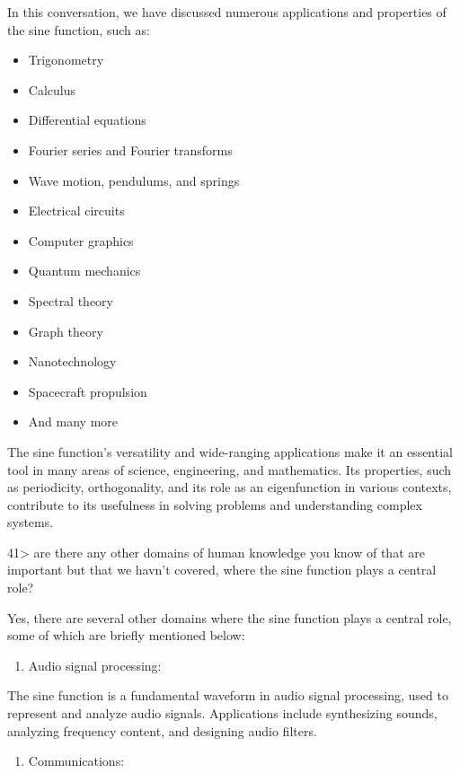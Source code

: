 \documentclass[
]{article}
\providecommand{\tightlist}{%
  \setlength{\itemsep}{0pt}\setlength{\parskip}{0pt}}
\begin{document}
In this conversation, we have discussed numerous applications and
properties of the sine function, such as:

\begin{itemize}
\tightlist
\item
  Trigonometry
\item
  Calculus
\item
  Differential equations
\item
  Fourier series and Fourier transforms
\item
  Wave motion, pendulums, and springs
\item
  Electrical circuits
\item
  Computer graphics
\item
  Quantum mechanics
\item
  Spectral theory
\item
  Graph theory
\item
  Nanotechnology
\item
  Spacecraft propulsion
\item
  And many more
\end{itemize}

The sine function's versatility and wide-ranging applications make it an
essential tool in many areas of science, engineering, and mathematics.
Its properties, such as periodicity, orthogonality, and its role as an
eigenfunction in various contexts, contribute to its usefulness in
solving problems and understanding complex systems.

41\textgreater{} are there any other domains of human knowledge you know
of that are important but that we havn't covered, where the sine
function plays a central role?

Yes, there are several other domains where the sine function plays a
central role, some of which are briefly mentioned below:

\begin{enumerate}
\def\labelenumi{\arabic{enumi}.}
\tightlist
\item
  Audio signal processing:
\end{enumerate}

The sine function is a fundamental waveform in audio signal processing,
used to represent and analyze audio signals. Applications include
synthesizing sounds, analyzing frequency content, and designing audio
filters.

\begin{enumerate}
\def\labelenumi{\arabic{enumi}.}
\setcounter{enumi}{1}
\tightlist
\item
  Communications:
\end{enumerate}
\end{document}
